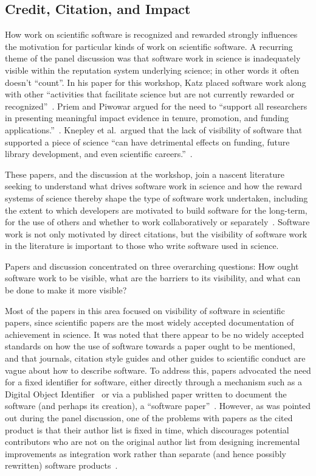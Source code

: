 \documentclass[11pt, oneside]{amsart}
\begin{document}
\subsection{Credit, Citation, and Impact}

How work on scientific software is recognized and rewarded strongly influences the motivation for particular kinds of work
on scientific software. A recurring theme of the panel discussion was
that software work in science is
inadequately visible within the reputation
system underlying science; in other words it often doesn't ``count''. In his paper for this workshop, Katz placed
software work along with other ``activities that facilitate science
but are not currently rewarded or
recognized''~\cite{Katz_WSSSPE}. Priem and Piwowar argued for the need
to ``support all researchers in presenting meaningful impact evidence
in tenure, promotion, and funding applications.''~\cite{Priem_WSSSPE}.
Knepley et al.~argued that the lack of visibility of software that supported a
piece of science ``can have detrimental effects on funding, future
library development, and even scientific
careers.''~\cite{Knepley_WSSSPE}.

These papers, and the discussion at the workshop, join a nascent
literature seeking to understand what drives software work in science
and how the reward systems of science thereby shape the type of
software work undertaken, including the extent to which developers are
motivated to build software for the long-term, for the use of others
and whether to work collaboratively or
separately~\cite{howison_incentives_2013, howison_scientific_2011,
  bietz_synergizing_2010}. Software work is not only motivated by
direct citations, but the visibility of software work in the
literature is important to those who write software used in science.

Papers and discussion concentrated on three overarching questions: How ought software
work to be visible, what are the barriers to its visibility, and what
can be done to make it more visible?

Most of the papers in this area focused on visibility of software in
scientific papers, since scientific papers are the most widely
accepted documentation of achievement in science. It was noted that
there appear to be no widely accepted standards on how the use of
software towards a paper ought to be mentioned, and that journals,
citation style guides and other guides to scientific conduct are vague
about how to describe software. To address this, papers advocated the
need for a fixed identifier for software, either directly through a
mechanism such as a Digital Object
Identifier~\cite{Katz_WSSSPE,Knepley_WSSSPE} or via a published paper
written to document the software (and perhaps its creation), a
``software paper''~\cite{Chue_Hong_WSSSPE}. However, as was pointed
out during the panel discussion, one of the problems with papers as
the cited product is that their author list is fixed in time, which
discourages potential contributors who are not on the original author
list from designing incremental improvements as integration work
rather than separate (and hence possibly rewritten) software
products~\cite{howison_incentives_2013}.
\end{document}
